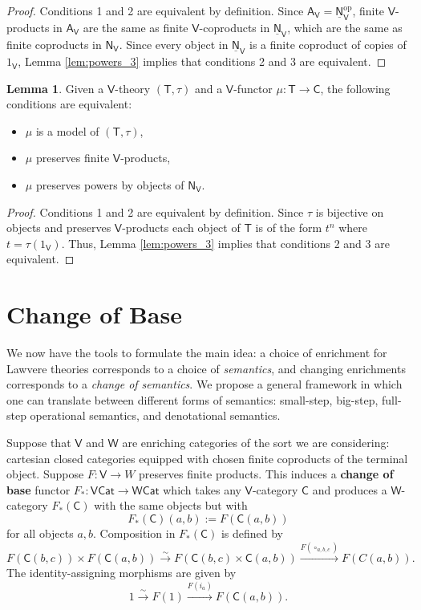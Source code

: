 \documentclass{amsart}
\theoremstyle{definition}
\newtheorem{lemma}[theorem]{Lemma}
\newcommand{\Cat}{\mathsf{Cat}}
\newcommand{\NN}{\mathsf{N}}
\newcommand{\A}{\mathsf{A}}
\newcommand{\V}{\mathsf{V}}
\newcommand{\W}{\mathsf{W}}
\newcommand{\C}{\mathsf{C}}
\newcommand{\T}{\mathsf{T}}
\newcommand{\op}{\mathrm{op}}
\newcommand{\maps}{\colon}
\begin{document}
\begin{proof} Conditions 1 and 2 are equivalent by definition.
Since $\A_\V = \underline{\NN}_\V^\op$, finite $\V$-products in $\A_\V$ are 
the same as finite $\V$-coproducts in $\underline{\NN}_\V$, which are the same as 
finite coproducts in $\NN_\V$.   Since every object in $\underline{\NN}_\V$ is a 
finite coproduct of copies of $1_\V$, Lemma \ref{lem:powers_3} implies that conditions
2 and 3 are equivalent.
\end{proof}

\begin{lemma}
\label{lem:powers_5}
Given a $\V$-theory $(\T,\tau)$ and a $\V$-functor $\mu \maps \T \to \C$,
the following conditions are equivalent:
\begin{itemize}
\item $\mu$ is a model of $(\T,\tau)$,
\item $\mu$ preserves finite $\V$-products,
\item $\mu$ preserves powers by objects of $\NN_\V$.
\end{itemize}
\end{lemma}

\begin{proof}
Conditions 1 and 2 are equivalent by definition.   Since $\tau$ is bijective on 
objects and preserves $\V$-products each object of $\T$ is of the form $t^n$ 
where $t = \tau(1_\V)$.   Thus, Lemma \ref{lem:powers_3} implies that
conditions 2 and 3 are equivalent.
\end{proof}

\section{Change of Base}
\label{sec:base_change}

We now have the tools to formulate the main idea: a choice of enrichment for Lawvere theories corresponds to a choice of \textit{semantics}, and changing enrichments corresponds to a \textit{change of semantics}. We propose a general framework in which one can translate between different forms of semantics: small-step, big-step, full-step operational semantics, and denotational semantics.

Suppose that $\V$ and $\W$ are enriching categories of the sort we are considering: 
cartesian closed categories equipped with chosen finite coproducts of the terminal object.
Suppose $F \maps \V \to W$ preserves finite products.   This induces a \textbf{change of base} functor $F_*\maps\V\Cat \to \W\Cat$ \cite{borceux} which takes any $\V$-category $\C$ and produces a $\W$-category $F_*(\C)$ with the same objects but with
\[      F_*(\C)(a,b) := F(\C(a,b)) \]
for all objects $a,b$.   Composition in $F_*(\C)$ is defined by
\[       F(\C(b,c)) \times F(\C(a,b)) \stackrel{\sim}{\longrightarrow} F(\C(b,c) \times \C(a,b)) 
\stackrel{F(\circ_{a,b,c})}{\longrightarrow} F(C(a,b)) . \]  
The identity-assigning morphisms are given by
\[          1 \stackrel{\sim}{\longrightarrow} F(1) \stackrel{F(i_a)}{\longrightarrow}
F(\C(a,b)) .\]
\end{document}
